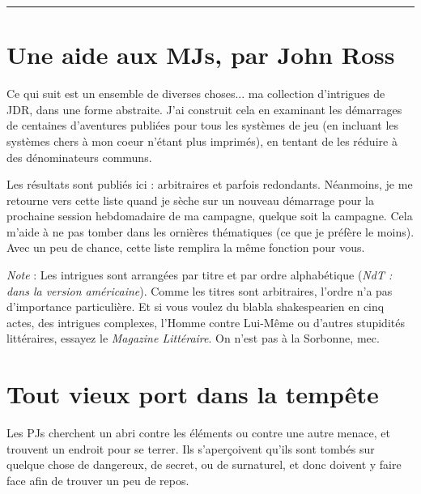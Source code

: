 \begin{multicols}{2}

\tableofcontents

\vspace{0.3cm}

\hrule

\section*{Une aide aux MJs, par John Ross}

Ce qui suit est un ensemble de diverses choses... ma collection d'intrigues de JDR, dans une forme abstraite. J'ai construit cela en examinant les démarrages de centaines d'aventures publiées pour tous les systèmes de jeu (en incluant les systèmes chers à mon coeur n'étant plus imprimés), en tentant de les réduire à des dénominateurs communs.

Les résultats sont publiés ici : arbitraires et parfois redondants. Néanmoins, je me retourne vers cette liste quand je sèche sur un nouveau démarrage pour la prochaine session hebdomadaire de ma campagne, quelque soit la campagne. Cela m'aide à ne pas tomber dans les ornières thématiques (ce que je préfère le moins). Avec un peu de chance, cette liste remplira la même fonction pour vous.

\emph{Note} : Les intrigues sont arrangées par titre et par ordre alphabétique (\textit{NdT : dans la version américaine}). Comme les titres sont arbitraires, l'ordre n'a pas d'importance particulière. Et si vous voulez du blabla shakespearien en cinq actes, des intrigues complexes, l'Homme contre Lui-Même ou d'autres stupidités littéraires, essayez le \textit{Magazine Littéraire}. On n'est pas à la Sorbonne, mec.

\section{Tout vieux port dans la tempête}
\hypertarget{port}{}


Les PJs cherchent un abri contre les éléments ou contre une autre menace, et trouvent un endroit pour se terrer. Ils s'aperçoivent qu'ils sont tombés sur quelque chose de dangereux, de secret, ou de surnaturel, et donc doivent y faire face afin de trouver un peu de repos.


\end{multicols}
